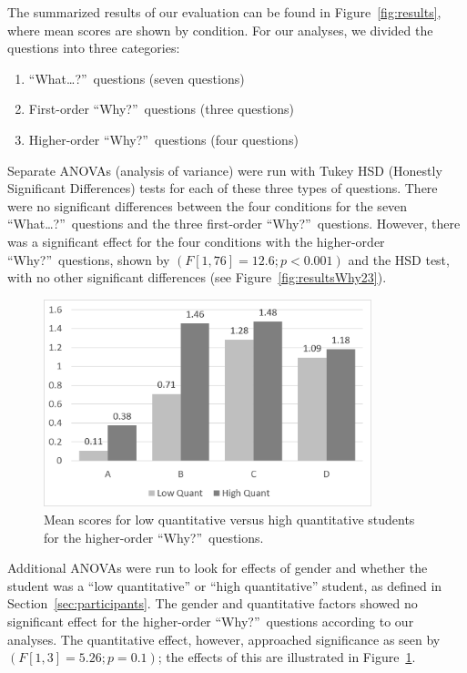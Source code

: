 The summarized results of our evaluation can be found in Figure~\ref{fig:results}, where mean scores are shown by condition.  For our analyses, we divided the questions into three categories:
\begin{enumerate}
\item ``What\ldots?''\ questions (seven questions)
\item First-order ``Why?''\ questions (three questions)
\item Higher-order ``Why?''\ questions (four questions)
\end{enumerate}
Separate ANOVAs (analysis of variance) were run with Tukey HSD (Honestly Significant Differences) tests for each of these three types of questions.  There were no significant differences between the four conditions for the seven ``What\ldots?''\ questions and the three first-order ``Why?''\ questions.    However, there was a significant effect for the four conditions with the higher-order ``Why?''\ questions, shown by $(F[1, 76] = 12.6; p < 0.001)$ and the HSD test, with no other significant differences (see Figure~\ref{fig:resultsWhy23}).

\begin{figure}[h]
	\centering
	\includegraphics[width=0.85\textwidth]{figures/png/results_arts_science.png}
	\caption[Mean scores for low quantitative versus high quantitative students for the higher-order ``Why?''\ questions]{Mean scores for low quantitative versus high quantitative students for the higher-order ``Why?''\ questions.}
	\label{fig:results_arts_science}
\end{figure}

Additional ANOVAs were run to look for effects of gender and whether the student was a ``low quantitative'' or ``high quantitative'' student, as defined in Section~\ref{sec:participants}.  The gender and quantitative factors showed no significant effect for the higher-order ``Why?''\ questions according to our analyses.  The quantitative effect, however, approached significance as seen by $(F[1, 3] = 5.26; p = 0.1)$; the effects of this are illustrated in Figure~\ref{fig:results_arts_science}.

